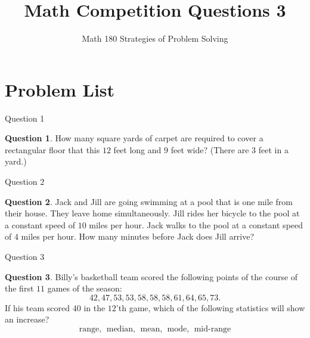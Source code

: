 \documentclass[handout]{beamer}
\title{Math Competition Questions 3}
\subtitle
{Math 180 Strategies of Problem Solving}
\author[W.R. Casper] %
{}%
\institute[California State University Fullerton] %
{
  Department of Mathematics\\
  California State University Fullerton}
\theoremstyle{definition}
\newtheorem{quest}{Question}
\begin{document}
\begin{frame}
  \titlepage
\end{frame}





\section{Problem List}
\begin{frame}{Question 1}
\begin{quest}
How many square yards of carpet are required to cover a rectangular floor that this $12$ feet long and $9$ feet wide?  (There are $3$ feet in a yard.)
\end{quest}
\end{frame}

\begin{frame}{Question 2}
\begin{quest}
Jack and Jill are going swimming at a pool that is one mile from their house.  They leave home simultaneously.  Jill rides her bicycle to the pool at a constant speed of $10$ miles per hour.  Jack walks to the pool at a constant speed of $4$ miles per hour.  How many minutes before Jack does Jill arrive?
\end{quest}
\end{frame}

\begin{frame}{Question 3}
\begin{quest}
Billy's basketball team scored the following points of the course of the first $11$ games of the season:
$$42,47,53,53,58,58,58,61,64,65,73.$$
If his team scored $40$ in the $12$'th game, which of the following statistics will show an increase?
$$\text{range},\ \ \text{median},\ \ \text{mean},\ \ \text{mode},\ \ \text{mid-range}$$
\end{quest}
\end{frame}
\end{document}
